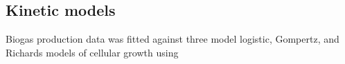 \subsection{Kinetic models}
Biogas production data was fitted against three model logistic, Gompertz, and
Richards models of cellular growth using  